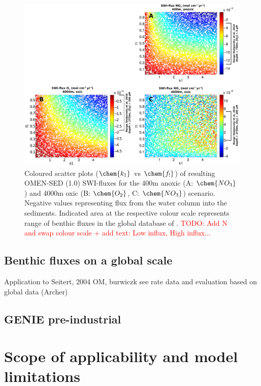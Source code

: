 \documentclass[gmd, manuscript]{copernicus}
\begin{document}
\begin{figure}[htbp]
\begin{center}
	\includegraphics[width=1.0\textwidth]{figures/SA/k1_vs_f1_SWIflux_COMBINED.pdf}
	\caption{Coloured scatter plots ($\chem{k_1}$ vs $\chem{f_!}$) of resulting OMEN-SED (1.0) SWI-fluxes for the 400m anoxic (A: $\chem{NO_3}$) and 4000m oxic (B: $\chem{O_2}$, C: $\chem{NO_3}$) scenario. 
	Negative values representing flux from the water column into the sediments.
	Indicated area at the respective colour scale represents range of benthic fluxes in the global database of \citet{bohlen_simple_2012}. 
	\textcolor{red}{TODO: Add N and swap colour scale + add text: Low influx, High influx...}}
	\label{fig:SA_Color_ScatterPlots}
\end{center}
\end{figure}




\subsection{Benthic fluxes on a global scale}
Application to Seitert, 2004 OM, burwiczk see rate data and evaluation based on global data (Archer)

\subsection{GENIE pre-industrial}\label{subsec:GENIE-pre-ind}

\section{Scope of applicability and model limitations}
\end{document}

